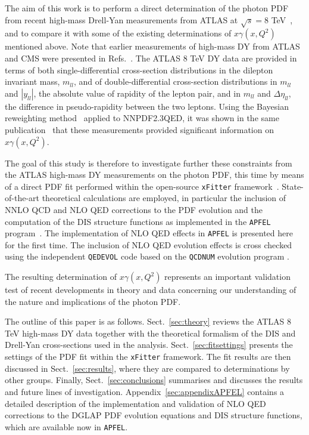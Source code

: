 The aim of this work is to perform a direct determination of the
photon PDF from recent high-mass Drell-Yan measurements from
ATLAS  at $\sqrt{s}=8$ TeV~\cite{Aad:2016zzw}, and to
compare it with some of the existing determinations of $x\gamma(x,Q^2)$
mentioned above.
%
Note that
earlier measurements of high-mass DY from ATLAS and CMS were presented
in Refs.~\cite{CMS:2014jea,Chatrchyan:2013tia,Aad:2013iua}.
%
The ATLAS 8 TeV DY data are provided in terms of both
single-differential cross-section distributions in the dilepton invariant mass,
$m_{ll}$, and of double-differential 
cross-section distributions in $m_{ll}$ and $|y_{ll}|$, the absolute value of rapidity of the
lepton pair, and in $m_{ll}$ and $\Delta\eta_{ll}$, the difference in
pseudo-rapidity between the two leptons.
%
Using the Bayesian reweighting method~\cite{Ball:2011gg,Ball:2010gb}
applied to NNPDF2.3QED, it was shown in the
same publication~\cite{Aad:2016zzw} that these
measurements provided significant information on $x\gamma(x,Q^2)$.

The goal of this study is therefore to investigate further these
constraints from the ATLAS high-mass DY measurements on the photon PDF,
this time by means of a direct PDF fit performed within the
open-source {\tt xFitter} framework~\cite{Alekhin:2014irh}.
%
State-of-the-art theoretical calculations are employed, in particular
the inclusion of  NNLO QCD and NLO QED corrections to the PDF evolution and
the computation of the DIS structure
functions as implemented in the {\tt APFEL} program~\cite{Bertone:2013vaa}.
%
The implementation of NLO QED effects in {\tt APFEL} is
presented here for
the first time.
%
The inclusion of NLO QED evolution effects is cross checked using the independent
{\tt QEDEVOL} code \cite{Sadykov:2014aua} based on the {\tt QCDNUM} evolution program \cite{Botje:2010ay}.

%
The resulting determination of $x\gamma(x,Q^2)$
represents an important validation test of
recent developments in theory and data concerning
our understanding of the nature and implications
of the photon PDF.

The outline of this paper is as follows.
%
Sect.~\ref{sec:theory} reviews the ATLAS 8 TeV high-mass DY data together
with the theoretical formalism of the DIS and Drell-Yan cross-sections
used in the analysis.
%
Sect.~\ref{sec:fitsettings} presents the settings of the PDF
fit within the {\tt xFitter} framework.
% 
The fit results are then discussed in Sect.~\ref{sec:results}, where
they are compared to determinations by other groups.
%
Finally, Sect.~\ref{sec:conclusions} summarises and discusses the results and
future lines of investigation.
%
Appendix~\ref{sec:appendixAPFEL} contains a detailed
description of the implementation and validation of NLO QED
corrections to the DGLAP PDF evolution equations
and DIS structure functions, which are
available now in {\tt APFEL}.
